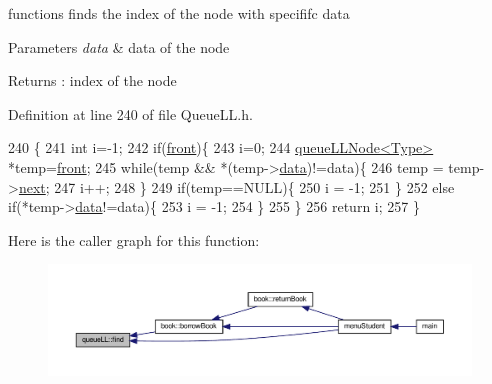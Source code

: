 functions finds the index of the node with specififc data 
\begin{DoxyParams}{Parameters}
{\em data} & data of the node \\
\hline
\end{DoxyParams}
\begin{DoxyReturn}{Returns}
\+: index of the node 
\end{DoxyReturn}


Definition at line 240 of file Queue\+L\+L.\+h.


\begin{DoxyCode}
240                        \{
241         \textcolor{keywordtype}{int} i=-1;
242         \textcolor{keywordflow}{if}(\hyperlink{classqueue_l_l_a622ea439d113fe8e4616320ec2346d8b}{front})\{
243             i=0;
244             \hyperlink{classqueue_l_l_node}{queueLLNode<Type>} *temp=\hyperlink{classqueue_l_l_a622ea439d113fe8e4616320ec2346d8b}{front};
245             \textcolor{keywordflow}{while}(temp && *(temp->\hyperlink{classqueue_l_l_node_a20b1170d8c5852b7dc01e56fda4e4206}{data})!=data)\{
246                 temp = temp->\hyperlink{classqueue_l_l_node_ab8367d61c51828d9f21d72537b62735f}{next};
247                 i++;
248             \}
249             \textcolor{keywordflow}{if}(temp==NULL)\{
250                 i = -1;
251             \}
252             \textcolor{keywordflow}{else} \textcolor{keywordflow}{if}(*temp->\hyperlink{classqueue_l_l_node_a20b1170d8c5852b7dc01e56fda4e4206}{data}!=data)\{
253                 i = -1;
254             \}
255         \}
256         \textcolor{keywordflow}{return} i;
257     \}
\end{DoxyCode}
Here is the caller graph for this function\+:
\nopagebreak
\begin{figure}[H]
\begin{center}
\leavevmode
\includegraphics[width=350pt]{classqueue_l_l_af46d9d07b7528da834c2c37d752c29f5_icgraph}
\end{center}
\end{figure}
\mbox{\label{classqueue_l_l_a8969feebcb563f0b489bc112422b9563}} 
